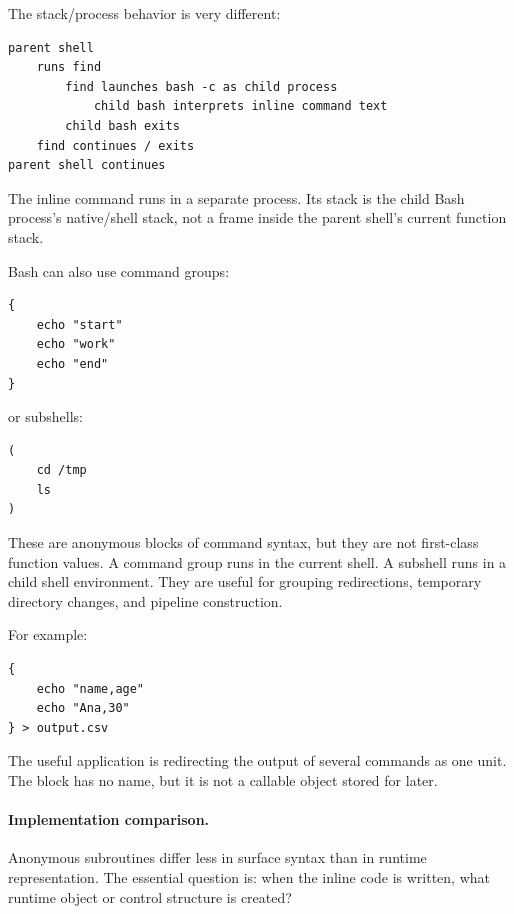 The stack/process behavior is very different:

\begin{verbatim}
parent shell
    runs find
        find launches bash -c as child process
            child bash interprets inline command text
        child bash exits
    find continues / exits
parent shell continues
\end{verbatim}

The inline command runs in a separate process. Its stack is the child Bash process's native/shell stack, not a frame inside the parent shell's current function stack.

Bash can also use command groups:

\begin{verbatim}
{
    echo "start"
    echo "work"
    echo "end"
}
\end{verbatim}

or subshells:

\begin{verbatim}
(
    cd /tmp
    ls
)
\end{verbatim}

These are anonymous blocks of command syntax, but they are not first-class function values. A command group runs in the current shell. A subshell runs in a child shell environment. They are useful for grouping redirections, temporary directory changes, and pipeline construction.

For example:

\begin{verbatim}
{
    echo "name,age"
    echo "Ana,30"
} > output.csv
\end{verbatim}

The useful application is redirecting the output of several commands as one unit. The block has no name, but it is not a callable object stored for later.

\paragraph{Implementation comparison.}

Anonymous subroutines differ less in surface syntax than in runtime representation. The essential question is: when the inline code is written, what runtime object or control structure is created?

